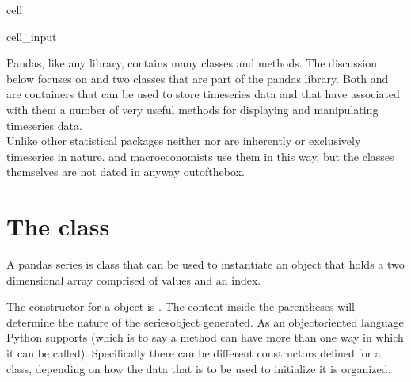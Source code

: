 \documentclass[letterpaper,10pt,english]{jupyterBook}
\begin{document}
\begin{sphinxuseclass}{cell}\begin{sphinxVerbatimInput}

\begin{sphinxuseclass}{cell_input}
\begin{sphinxVerbatim}[commandchars=\\\{\}]
    
\end{sphinxVerbatim}

\end{sphinxuseclass}\end{sphinxVerbatimInput}

\end{sphinxuseclass}
\sphinxAtStartPar
Pandas, like any library, contains many classes and methods.  The discussion below focuses on  and  two classes that are part of the pandas library.  Both  and  are containers that can be used to store time\sphinxhyphen{}series data and that have associated with them a number of very useful methods for displaying and manipulating time\sphinxhyphen{}series data.\\
Unlike other statistical packages neither  nor  are inherently or exclusively time\sphinxhyphen{}series in nature.   and macro\sphinxhyphen{}economists use them in this way, but the classes themselves are not dated in anyway out\sphinxhyphen{}of\sphinxhyphen{}the\sphinxhyphen{}box.


\section{The  class }
\label{\detokenize{content/04_PythonEssentials/PythonPandasDataframes:the-pandas-class-series}}
\sphinxAtStartPar
A pandas series is class that can be used to instantiate an object that holds a two dimensional array comprised of values and an index.

\sphinxAtStartPar
The constructor for a  object is .  The content inside the parentheses will determine the nature of the series\sphinxhyphen{}object generated.  As an object\sphinxhyphen{}oriented language Python supports  (which is to say a method can have more than one way in which it can be called). Specifically there can be different constructors defined for a class, depending on how the data that is to be used to initialize it is organized.
\end{document}
